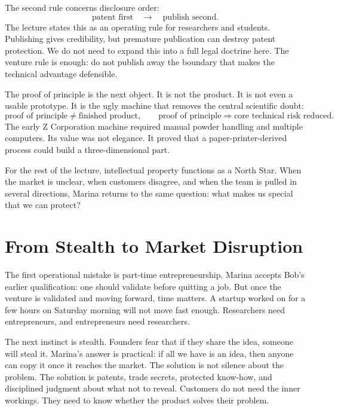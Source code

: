The second rule concerns disclosure order:
\begin{equation}
\text{patent first}\quad\longrightarrow\quad \text{publish second}.
\end{equation}
The lecture states this as an operating rule for researchers and students. Publishing gives credibility, but premature publication can destroy patent protection. We do not need to expand this into a full legal doctrine here. The venture rule is enough: do not publish away the boundary that makes the technical advantage defensible.

The proof of principle is the next object. It is not the product. It is not even a usable prototype. It is the ugly machine that removes the central scientific doubt:
\begin{equation}
\text{proof of principle}
\neq
\text{finished product},
\qquad
\text{proof of principle}
\Rightarrow
\text{core technical risk reduced}.
\end{equation}
The early Z Corporation machine required manual powder handling and multiple computers. Its value was not elegance. It proved that a paper-printer-derived process could build a three-dimensional part.

\begin{remark}
For the rest of the lecture, intellectual property functions as a North Star. When the market is unclear, when customers disagree, and when the team is pulled in several directions, Marina returns to the same question: what makes us special that we can protect?
\end{remark}

\section{From Stealth to Market Disruption}

The first operational mistake is part-time entrepreneurship. Marina accepts Bob's earlier qualification: one should validate before quitting a job. But once the venture is validated and moving forward, time matters. A startup worked on for a few hours on Saturday morning will not move fast enough. Researchers need entrepreneurs, and entrepreneurs need researchers.

The next instinct is stealth. Founders fear that if they share the idea, someone will steal it. Marina's answer is practical: if all we have is an idea, then anyone can copy it once it reaches the market. The solution is not silence about the problem. The solution is patents, trade secrets, protected know-how, and disciplined judgment about what not to reveal. Customers do not need the inner workings. They need to know whether the product solves their problem.

